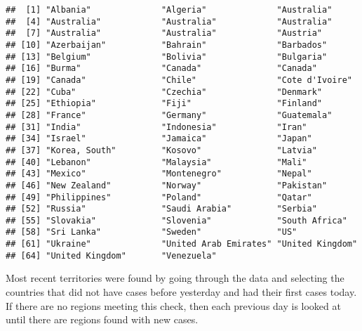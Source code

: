 \documentclass[
]{article}
\newenvironment{Shaded}{\begin{snugshade}}{\end{snugshade}}
\newcommand{\CommentTok}[1]{\textcolor[rgb]{0.56,0.35,0.01}{\textit{#1}}}
\begin{document}
\begin{verbatim}
##  [1] "Albania"              "Algeria"              "Australia"           
##  [4] "Australia"            "Australia"            "Australia"           
##  [7] "Australia"            "Australia"            "Austria"             
## [10] "Azerbaijan"           "Bahrain"              "Barbados"            
## [13] "Belgium"              "Bolivia"              "Bulgaria"            
## [16] "Burma"                "Canada"               "Canada"              
## [19] "Canada"               "Chile"                "Cote d'Ivoire"       
## [22] "Cuba"                 "Czechia"              "Denmark"             
## [25] "Ethiopia"             "Fiji"                 "Finland"             
## [28] "France"               "Germany"              "Guatemala"           
## [31] "India"                "Indonesia"            "Iran"                
## [34] "Israel"               "Jamaica"              "Japan"               
## [37] "Korea, South"         "Kosovo"               "Latvia"              
## [40] "Lebanon"              "Malaysia"             "Mali"                
## [43] "Mexico"               "Montenegro"           "Nepal"               
## [46] "New Zealand"          "Norway"               "Pakistan"            
## [49] "Philippines"          "Poland"               "Qatar"               
## [52] "Russia"               "Saudi Arabia"         "Serbia"              
## [55] "Slovakia"             "Slovenia"             "South Africa"        
## [58] "Sri Lanka"            "Sweden"               "US"                  
## [61] "Ukraine"              "United Arab Emirates" "United Kingdom"      
## [64] "United Kingdom"       "Venezuela"
\end{verbatim}

\begin{Shaded}
\end{Shaded}

Most recent territories were found by going through the data and
selecting the countries that did not have cases before yesterday and had
their first cases today. If there are no regions meeting this check,
then each previous day is looked at until there are regions found with
new cases.
\end{document}
